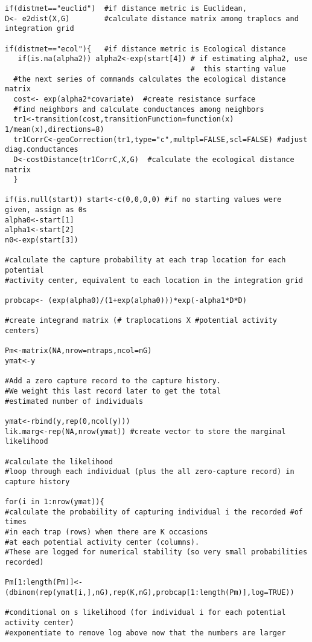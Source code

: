 \documentclass[12pt]{article}
\begin{document}
\begin{spacing}{1.2}
{\begin{verbatim}
if(distmet=="euclid")  #if distance metric is Euclidean,
D<- e2dist(X,G)        #calculate distance matrix among traplocs and integration grid

if(distmet=="ecol"){   #if distance metric is Ecological distance 
   if(is.na(alpha2)) alpha2<-exp(start[4]) # if estimating alpha2, use 
                                           #  this starting value
  #the next series of commands calculates the ecological distance matrix 
  cost<- exp(alpha2*covariate)  #create resistance surface
  #find neighbors and calculate conductances among neighbors
  tr1<-transition(cost,transitionFunction=function(x) 1/mean(x),directions=8)
  tr1CorrC<-geoCorrection(tr1,type="c",multpl=FALSE,scl=FALSE) #adjust diag.conductances
  D<-costDistance(tr1CorrC,X,G)  #calculate the ecological distance matrix
  }

if(is.null(start)) start<-c(0,0,0,0) #if no starting values were given, assign as 0s
alpha0<-start[1]
alpha1<-start[2]
n0<-exp(start[3])

#calculate the capture probability at each trap location for each potential 
#activity center, equivalent to each location in the integration grid

probcap<- (exp(alpha0)/(1+exp(alpha0)))*exp(-alpha1*D*D) 

#create integrand matrix (# traplocations X #potential activity centers)

Pm<-matrix(NA,nrow=ntraps,ncol=nG) 
ymat<-y

#Add a zero capture record to the capture history. 
#We weight this last record later to get the total
#estimated number of individuals

ymat<-rbind(y,rep(0,ncol(y)))  
lik.marg<-rep(NA,nrow(ymat)) #create vector to store the marginal likelihood

#calculate the likelihood  
#loop through each individual (plus the all zero-capture record) in capture history

for(i in 1:nrow(ymat)){ 
#calculate the probability of capturing individual i the recorded #of times 
#in each trap (rows) when there are K occasions 
#at each potential activity center (columns).
#These are logged for numerical stability (so very small probabilities recorded)

Pm[1:length(Pm)]<- (dbinom(rep(ymat[i,],nG),rep(K,nG),probcap[1:length(Pm)],log=TRUE))

#conditional on s likelihood (for individual i for each potential activity center)
#exponentiate to remove log above now that the numbers are larger


\end{verbatim}}
\end{spacing}
\end{document}
